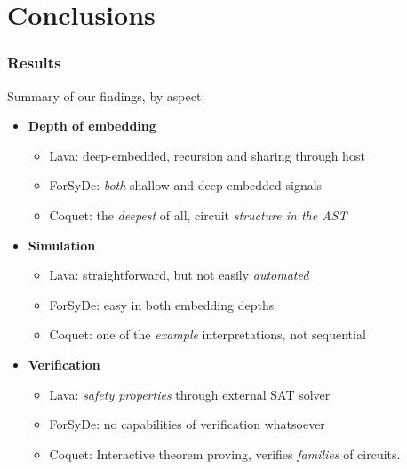 \section{Conclusions}
\label{sec:conclusions}
    \frame{\sectionpage}

    \begin{frame}
        \frametitle{Results}
        \par{Summary of our findings, by aspect:}
        \vspace{0.2cm}
        \begin{itemize}
            \item \textbf{Depth of embedding}
                \begin{itemize}
                    \item Lava: deep-embedded, recursion and sharing through host
                    \item ForSyDe: \emph{both} shallow and deep-embedded signals
                    \item Coquet: the \emph{deepest} of all, circuit \emph{structure in the AST}
                \end{itemize}
            \item \textbf{Simulation}
                \begin{itemize}
                    \item Lava: straightforward, but not easily \emph{automated}
                    \item ForSyDe: easy in both embedding depths
                    \item Coquet: one of the \emph{example} interpretations, not sequential
                \end{itemize}
            \item \textbf{Verification}
                \begin{itemize}
                    \item Lava: \emph{safety properties} through external SAT solver
                    \item ForSyDe: no capabilities of verification whatsoever
                    \item Coquet: Interactive theorem proving, verifies \emph{families} of circuits.
                \end{itemize}
        \end{itemize}


\end{frame}
